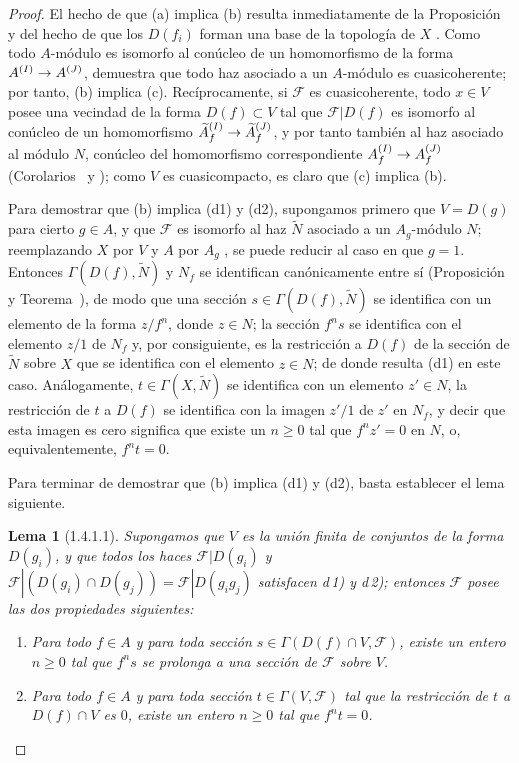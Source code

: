 \documentclass[oneside]{amsart}
\theoremstyle{ega-env-style}
\theoremstyle{ega-thm-env-style}
\newtheorem*{lemma}{Lema}
\theoremstyle{ega-defn-env-style}
\def\geq{\geqslant}                 %
\renewcommand{\to}{\mathchoice{\longrightarrow}{\rightarrow}{\rightarrow}{\rightarrow}}
\newcommand{\oldpage}[2][]{{\marginnote{\normalfont{\textbf{#1}~|~#2}}}\ignorespaces}
\let\EGAOriginalLabel\label
\renewcommand{\label}[1]{\phantomsection\EGAOriginalLabel{#1}}
\begin{document}
\begin{proof}
El hecho de que (a) implica (b) resulta inmediatamente de la Proposición~ y del hecho de que los $D(f_i)$ forman una base de la topología de $X$ .
Como todo $A$-módulo es isomorfo al conúcleo de un homomorfismo de la forma $A^{(I)}\to A^{(J)}$,  demuestra que todo haz asociado a un $A$-módulo es cuasicoherente;
por tanto, (b) implica (c).
Recíprocamente, si $\mathscr{F}$ es cuasicoherente, todo $x\in V$ posee una vecindad de la forma $D(f)\subset V$ tal que $\mathscr{F}|D(f)$ es isomorfo al conúcleo de un homomorfismo $\widetilde{A}_f^{(I)}\to\widetilde{A}_f^{(J)}$, y por tanto también al haz asociado al módulo $N$, conúcleo del homomorfismo correspondiente
$A_f^{(I)}\to A_f^{(J)}$ (Corolarios~ y );
como $V$ es cuasicompacto, es claro que (c) implica (b).

\oldpage[I]{91}
Para demostrar que (b) implica (d1) y (d2), supongamos primero que $V=D(g)$ para cierto $g\in A$, y que $\mathscr{F}$ es isomorfo al haz $\widetilde{N}$ asociado a un $A_g$-módulo $N$;
reemplazando $X$ por $V$ y $A$ por $A_g$ , se puede reducir al caso en que $g=1$.
Entonces $\Gamma(D(f),\widetilde{N})$ y $N_f$ se identifican canónicamente entre sí (Proposición~ y Teorema~), de modo que una sección $s\in\Gamma(D(f),\widetilde{N})$ se identifica con un elemento de la forma $z/f^n$, donde $z\in N$;
la sección $f^n s$ se identifica con el elemento $z/1$ de $N_f$ y, por consiguiente, es la restricción a $D(f)$ de la sección de $\widetilde{N}$ sobre $X$ que se identifica con el elemento $z\in N$;
de donde resulta (d1) en este caso.
Análogamente, $t\in\Gamma(X,\widetilde{N})$ se identifica con un elemento $z'\in N$, la restricción de $t$ a $D(f)$ se identifica con la imagen $z'/1$ de $z'$ en $N_f$, y decir que esta imagen es cero significa que existe un $n\geq0$ tal que $f^n z'=0$ en $N$, o, equivalentemente, $f^n t=0$.

Para terminar de demostrar que (b) implica (d1) y (d2), basta establecer el lema siguiente.
\begin{lemma}[1.4.1.1]
\label{I.1.4.1.1}
Supongamos que $V$ es la unión finita de conjuntos de la forma $D(g_i)$, y que todos los haces $\mathscr{F}|D(g_i)$ y $\mathscr{F}|(D(g_i)\cap D(g_j))=\mathscr{F}|D(g_i g_j)$ satisfacen \textup{d\,1)} y \textup{d\,2)};
entonces $\mathscr{F}$ posee las dos propiedades siguientes:
\begin{enumerate}
  \item[\textup{d'\,1)}] Para todo $f\in A$ y para toda sección $s\in\Gamma(D(f)\cap V,\mathscr{F})$, existe un entero $n\geq0$ tal que $f^n s$ se prolonga a una sección de $\mathscr{F}$ sobre $V$.
  \item[\textup{d'\,2)}] Para todo $f\in A$ y para toda sección $t\in\Gamma(V,\mathscr{F})$ tal que la restricción de $t$ a $D(f)\cap V$ es $0$, existe un entero $n\geq0$ tal que $f^n t=0$.
\end{enumerate}
\end{lemma}


\end{proof}
\end{document}
